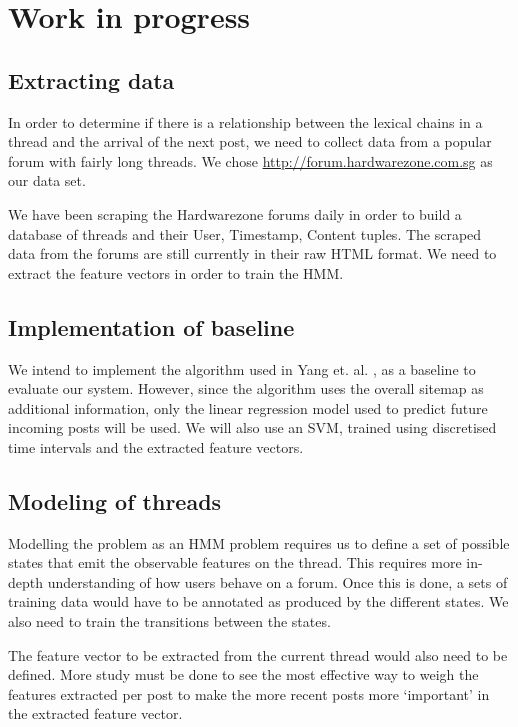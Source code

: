 \documentclass[12 pt]{article}
\begin{document}
\section{Work in progress}
\subsection{Extracting data}
In order to determine if there is a relationship between the lexical chains in a thread and the arrival of the next post, we need to collect data from a popular forum with fairly long threads. We chose \url{http://forum.hardwarezone.com.sg} as our data set.

We have been scraping the Hardwarezone forums daily in order to build a database of threads and their User, Timestamp, Content tuples. The scraped data from the forums are still currently in their raw HTML format. We need to extract the feature vectors in order to train the HMM.
\subsection{Implementation of baseline}
We intend to implement the algorithm used in Yang et. al. \cite{Yang2009}, as a baseline to evaluate our system. However, since the algorithm uses the overall sitemap as additional information, only the linear regression model used to predict future incoming posts will be used. We will also use an SVM, trained using discretised time intervals and the extracted feature vectors.

\subsection{Modeling of threads}
Modelling the problem as an HMM problem requires us to define a set of possible states that emit the observable features on the thread. This requires more in-depth understanding of how users behave on a forum. Once this is done, a sets of training data would have to be annotated as produced by the different states. We also need to train the transitions between the states.

The feature vector to be extracted from the current thread would also need to be defined. More study must be done to see the most effective way to weigh the features extracted per post to make the more recent posts more `important' in the extracted feature vector.
\end{document}
